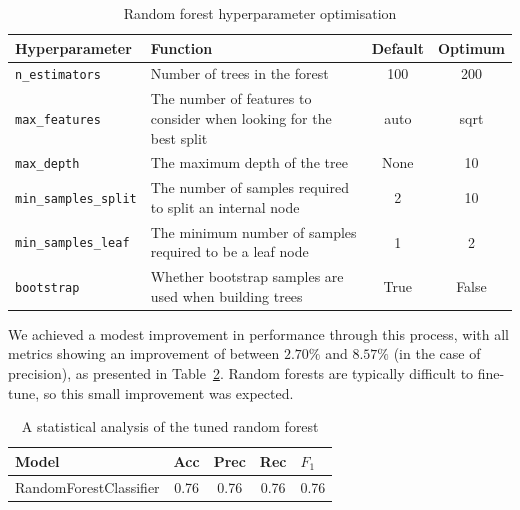 \documentclass[12pt,a4paper]{article}
\begin{document}
\begin{table}[h!]
\centering
\caption{Random forest hyperparameter optimisation}
\label{table:results_parameters}
\begin{tabular}{|l|p{7cm}|c|c|}
\hline
\textbf{Hyperparameter} & \textbf{Function}                                                  & \multicolumn{1}{l|}{\textbf{Default}} & \multicolumn{1}{l|}{\textbf{Optimum}} \\ \hline
\verb|n_estimators|           & Number of trees in the forest                                      & 100                                   & 200                                   \\ \hline
\verb|max_features|           & The number of features to consider when looking for the best split & auto                                  & sqrt                                  \\ \hline
\verb|max_depth|              & The maximum depth of the tree                                      & None                                  & 10                                    \\ \hline
\verb|min_samples_split|     & The number of samples required to split an internal node           & 2                                     & 10                                    \\ \hline
\verb|min_samples_leaf|      & The minimum number of samples required to be a leaf node           & 1                                     & 2                                     \\ \hline
\verb|bootstrap|               & Whether bootstrap samples are used when building trees             & True                                  & False                                 \\ \hline
\end{tabular}
\end{table}

We achieved a modest improvement in performance through this process, with all metrics showing an improvement of between $2.70\%$ and $8.57\%$ (in the case of precision), as presented in Table~\ref{table:results_tune}. Random forests are typically difficult to fine-tune, so this small improvement was expected.

\begin{table}[htb]
\centering
\caption{A statistical analysis of the tuned random forest}
\label{table:results_tune}
\begin{tabular}{|p{5cm}|c|c|c|c|}
\hline
\textbf{Model}                  & \multicolumn{1}{l|}{\textbf{Acc}} & \multicolumn{1}{l|}{\textbf{Prec}} & \multicolumn{1}{l|}{\textbf{Rec}} & \multicolumn{1}{l|}{\textbf{$F_1$}} \\ \hline
RandomForestClassifier & 0.76                     & 0.76                      & 0.76                     & 0.76                      \\ \hline
\end{tabular}
\end{table}
\end{document}
